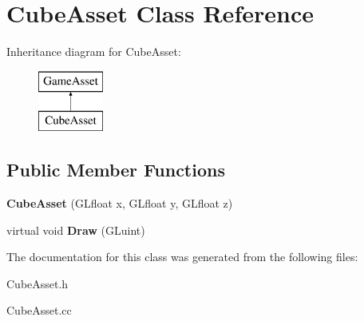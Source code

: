 \hypertarget{classCubeAsset}{}\section{Cube\+Asset Class Reference}
\label{classCubeAsset}
Inheritance diagram for Cube\+Asset\+:\begin{figure}[H]
\begin{center}
\leavevmode
\includegraphics[height=2.000000cm]{classCubeAsset}
\end{center}
\end{figure}
\subsection*{Public Member Functions}
\begin{DoxyCompactItemize}
\item 
{\bfseries Cube\+Asset} (G\+Lfloat x, G\+Lfloat y, G\+Lfloat z)\hypertarget{classCubeAsset_a0252e564114a3cda7e3911ef95742a34}{}\label{classCubeAsset_a0252e564114a3cda7e3911ef95742a34}

\item 
virtual void {\bfseries Draw} (G\+Luint)\hypertarget{classCubeAsset_a1af568486056e254ffcf98fd99947bfe}{}\label{classCubeAsset_a1af568486056e254ffcf98fd99947bfe}

\end{DoxyCompactItemize}


The documentation for this class was generated from the following files\+:\begin{DoxyCompactItemize}
\item 
Cube\+Asset.\+h\item 
Cube\+Asset.\+cc\end{DoxyCompactItemize}
